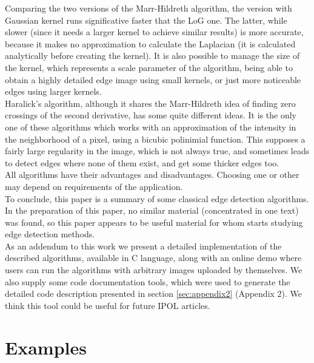\documentclass{ipol}
\numberwithin{equation}{section}
\numberwithin{table}{section}
\numberwithin{figure}{section}
\begin{document}
Comparing the two versions of the Marr-Hildreth algorithm, the version with Gaussian kernel runs significative faster that the LoG one. The latter, while slower (since it needs a larger kernel to achieve similar results) is more accurate, because it makes no approximation to calculate the Laplacian (it is calculated analytically before creating the kernel). It is also possible to manage the size of the kernel, which represents a scale parameter of the algorithm, being able to obtain a highly detailed edge image using small kernels, or just more noticeable edges using larger kernels. \\

Haralick's algorithm, although it shares the Marr-Hildreth idea of finding zero crossings of the second derivative, has some quite different ideas. It is the only one of these algorithms which works with an approximation of the intensity in the neighborhood of a pixel, using a bicubic polinimial function. This supposes a fairly large regularity in the image, which is not always true, and sometimes leads to detect edges where none of them exist, and get some thicker edges too. \\

All algorithms have their advantages and disadvantages. Choosing one or other may depend on requirements of the application. \\ 

To conclude, this paper is a summary of some classical edge detection algorithms. In the preparation of this paper, no similar material (concentrated in one text) was found, so this paper appears to be useful material for whom starts studying edge detection methods. \\

As an addendum to this work we present a detailed implementation of the described algorithms, 
available in C language, along with an online demo where users can run the algorithms 
with arbitrary images uploaded by themselves. We also supply some code documentation tools, 
which were used to generate the detailed code description presented in section \ref{sec:appendix2} (Appendix 2). We think this tool could be useful for future IPOL articles. \\

\clearpage
\section{Examples}
\label{sec:examples}
\end{document}
